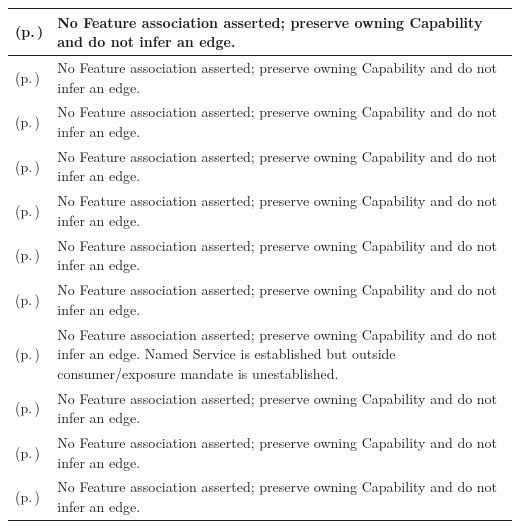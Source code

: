 \begin{longtable}{|>{\raggedright\arraybackslash}p{0.38\TableWidth}|>{\raggedright\arraybackslash}p{0.62\TableWidth}|}
\nameref{service:preventive-screening-status-query} (p.\,\pageref{service:preventive-screening-status-query}) & No Feature association asserted; preserve owning Capability and do not infer an edge.\\\hline
\nameref{function:bind-community-support-network-context} (p.\,\pageref{function:bind-community-support-network-context}) & No Feature association asserted; preserve owning Capability and do not infer an edge.\\\hline
\nameref{service:community-care-team-query} (p.\,\pageref{service:community-care-team-query}) & No Feature association asserted; preserve owning Capability and do not infer an edge.\\\hline
\nameref{function:manage-clinic-practice-capacity} (p.\,\pageref{function:manage-clinic-practice-capacity}) & No Feature association asserted; preserve owning Capability and do not infer an edge.\\\hline
\nameref{service:ward-operational-summary-query} (p.\,\pageref{service:ward-operational-summary-query}) & No Feature association asserted; preserve owning Capability and do not infer an edge.\\\hline
\nameref{function:manage-theatre-capacity} (p.\,\pageref{function:manage-theatre-capacity}) & No Feature association asserted; preserve owning Capability and do not infer an edge.\\\hline
\nameref{service:ed-operational-status-query} (p.\,\pageref{service:ed-operational-status-query}) & No Feature association asserted; preserve owning Capability and do not infer an edge.\\\hline
\nameref{service:ambulatory-session-status-query} (p.\,\pageref{service:ambulatory-session-status-query}) & No Feature association asserted; preserve owning Capability and do not infer an edge. Named Service is established but outside consumer/exposure mandate is unestablished.\\\hline
\nameref{function:manage-mobile-service-capacity} (p.\,\pageref{function:manage-mobile-service-capacity}) & No Feature association asserted; preserve owning Capability and do not infer an edge.\\\hline
\nameref{function:track-operational-staff-presence} (p.\,\pageref{function:track-operational-staff-presence}) & No Feature association asserted; preserve owning Capability and do not infer an edge.\\\hline
\nameref{service:staff-presence-telemetry-query} (p.\,\pageref{service:staff-presence-telemetry-query}) & No Feature association asserted; preserve owning Capability and do not infer an edge.\\\hline

\end{longtable}
